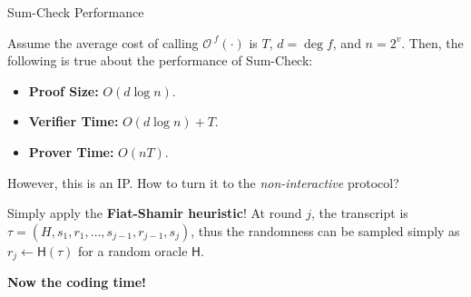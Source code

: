 \documentclass{zkdl-presentation-template}
\begin{document}
    \begin{frame}{Sum-Check Performance}
        \begin{lemma}
            Assume the average cost of calling $\mathcal{O}^{\; f}(\cdot)$ is
            $T$, $d = \deg f$, and $n=2^v$. Then, the following is true about
            the performance of Sum-Check:\pause
            \begin{itemize}
                \item \textbf{Proof Size:} $O(d\log n)$.
                \item \textbf{Verifier Time:} $O(d\log n) + T$.
                \item \textbf{Prover Time:} $O(nT)$.
            \end{itemize}
        \end{lemma}

        \pause However, this is an IP. How to turn it to the \textit{non-interactive}
        protocol? 

        \pause Simply apply the \textbf{Fiat-Shamir heuristic}! At round $j$, the
        transcript is $\tau=(H,s_1,r_1,\dots,s_{j-1},r_{j-1},s_j)$, thus the
        randomness can be sampled simply as $r_j \gets \mathsf{H}(\tau)$ for
        a random oracle $\mathsf{H}$.\pause

        \begin{center}
            \textcolor{oc-green-8}{\textbf{Now the coding time!}}
        \end{center}
    \end{frame}

    \makeclosingframe
\end{document}
